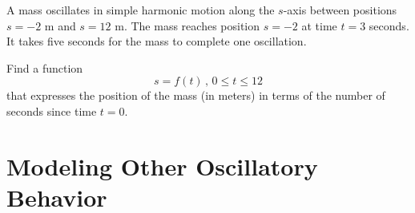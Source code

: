 \documentclass{ximera}
\begin{document}
\begin{question}  \label{Qdgyh5y43}
A mass oscillates in simple harmonic motion along the $s$-axis between positions $s=-2$ m and $s=12$ m. The mass reaches position $s=-2$ at time $t=3$ seconds. It takes five seconds for the mass to complete one oscillation. 

 Find a function
\[
   s = f(t) \, , \, 0\leq t \leq 12
\]  
that expresses the position of the mass (in meters) in terms of the number of seconds since time $t=0$.

\end{question}


\section{Modeling Other Oscillatory Behavior}
\end{document}
